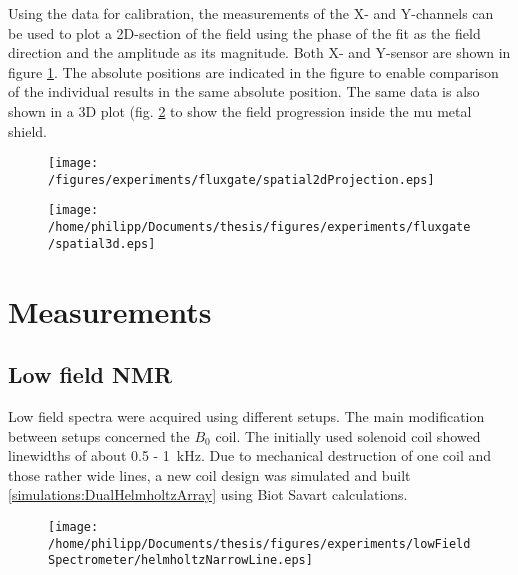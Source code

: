         Using the data for calibration, the measurements of the X- and Y-channels can be used to plot a 2D-section of the field using the phase of the fit as the field direction and the amplitude as its magnitude. Both X- and Y-sensor are shown in figure \ref{fig:results:fluxgate:plotSpatial2d}. The absolute positions are indicated in the figure to enable comparison of the individual results in the same absolute position. The same data is also shown in a 3D plot (fig. \ref{fig:results:fluxgate:plotSpatial3d} to show the field progression inside the mu metal shield.
        \begin{figure}[t]
            \label{fig:results:fluxgate:plotSpatial2d}
            \centering
            \texttt{[image: /figures/experiments/fluxgate/spatial2dProjection.eps]}
        \end{figure}
        \begin{figure}[t]
            \label{fig:results:fluxgate:plotSpatial3d}
            \centering
            \texttt{[image: /home/philipp/Documents/thesis/figures/experiments/fluxgate/spatial3d.eps]}
        \end{figure}
\section{Measurements}
    \subsection{Low field NMR}
    Low field spectra were acquired using different setups. The main modification between setups concerned the $B_0$ coil. The initially used solenoid coil showed linewidths of about 0.5 - \SI{1}{\kilo\hertz}. Due to mechanical destruction of one coil and those rather wide lines, a new coil design was simulated and built \ref{simulations:DualHelmholtzArray} using Biot Savart calculations.
    \begin{figure}[h] 
        \centering
    \end{figure}
    \begin{figure}[h]
        \centering
        \texttt{[image: /home/philipp/Documents/thesis/figures/experiments/lowFieldSpectrometer/helmholtzNarrowLine.eps]}
    \end{figure}
